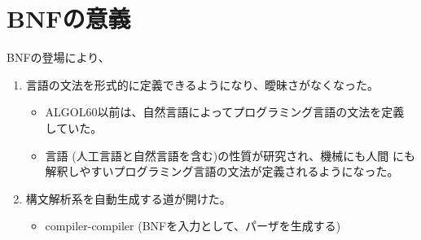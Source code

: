 \documentclass[slide,papersize,fleqn,22pt]{jsarticle}
\begin{document}
\section{BNFの意義}
\footnotesize
BNFの登場により、
\begin{enumerate}
\item 言語の文法を形式的に定義できるようになり、曖昧さがなくなった。
  \begin{itemize}
  \item ALGOL60以前は、自然言語によってプログラミング言語の文法を定義
    していた。
  \item 言語 (人工言語と自然言語を含む)の性質が研究され、機械にも人間
    にも解釈しやすいプログラミング言語の文法が定義されるようになった。
  \end{itemize}
\item 構文解析系を自動生成する道が開けた。
  \begin{itemize}
  \item compiler-compiler (BNFを入力として、パーザを生成する)
  \end{itemize}
\end{enumerate}
\end{document}
